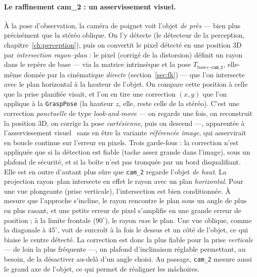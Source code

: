 \paragraph{Le raffinement cam\_2 : un asservissement visuel.} À la pose d'observation, la caméra de poignet voit l'objet \emph{de près} --- bien plus précisément que la stéréo oblique. On l'y détecte (le détecteur de la perception, chapitre~\ref{ch:perception}), puis on convertit le pixel détecté en une position 3D par \emph{intersection rayon--plan} : le pixel (corrigé de la distorsion) définit un rayon dans le repère de base --- via la matrice intrinsèque et la pose $T_{\text{base}\leftarrow\texttt{cam\_2}}$, elle-même donnée par la cinématique \emph{directe} (section~\ref{sec:fk}) --- que l'on intersecte avec le plan horizontal à la hauteur de l'objet. On compare cette position à celle que la prise planifiée visait, et l'on en tire une correction $(x, y)$ que l'on applique à la \texttt{GraspPose} (la hauteur $z$, elle, reste celle de la stéréo). C'est une correction \emph{ponctuelle} de type \emph{look-and-move} --- on regarde une fois, on reconstruit la position 3D, on corrige la pose \emph{cartésienne}, puis on descend ---, apparentée à l'asservissement visuel~\cite{chaumette_visual_2006, flandin_eye--handeye--hand_2000} sans en être la variante \emph{référencée image}, qui asservirait en boucle continue sur l'erreur en pixels. Trois garde-fous : la correction n'est appliquée que si la détection est fiable (tache assez grande dans l'image), sous un plafond de sécurité, et si la boîte n'est pas tronquée par un bord disqualifiant. Elle est en outre d'autant plus sûre que \texttt{cam\_2} regarde l'objet \emph{de haut}. La projection rayon--plan intersecte en effet le rayon avec un plan \emph{horizontal}. Pour une vue plongeante (prise verticale), l'intersection est bien conditionnée. À mesure que l'approche s'incline, le rayon rencontre le plan sous un angle de plus en plus rasant, et une petite erreur de pixel s'amplifie en une grande erreur de position ; à la limite frontale ($90^{\circ}$), le rayon \emph{rase} le plan. Une vue oblique, comme la diagonale à $45^{\circ}$, voit de surcroît à la fois le dessus et un côté de l'objet, ce qui biaise le centre détecté. La correction est donc la plus fiable pour la prise \emph{verticale} --- de loin la plus fréquente ---, un plafond d'inclinaison réglable permettant, au besoin, de la désactiver au-delà d'un angle choisi. Au passage, \texttt{cam\_2} mesure aussi le grand axe de l'objet, ce qui permet de réaligner les mâchoires.

